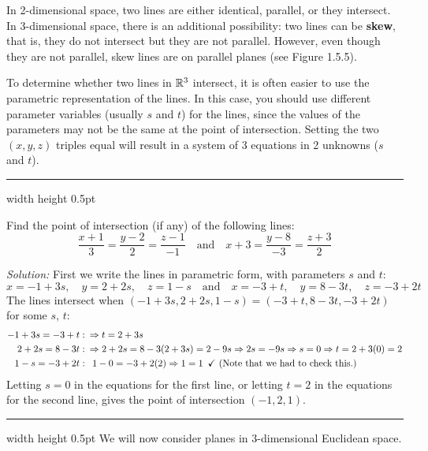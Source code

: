 \piccaption[]{}
In 2-dimensional space, two lines are either identical, parallel, or they intersect. In 3-dimensional space, there is an
additional possibility: two lines can be \textbf{skew}, that is, they do not intersect but they are not
parallel. However, even though they are not parallel, skew lines are on parallel planes (see Figure 1.5.5).

To determine
whether two lines in $\mathbb{R}^{3}$ intersect, it is often easier to use the parametric representation of the lines. In this
case, you should use different parameter variables (usually $s$ and $t$) for the lines, since the values of the
parameters may not be the same at the point of intersection. Setting the two $(x,y,z)$ triples equal will result in a
system of 3 equations in 2 unknowns ($s$ and $t$).

\vspace{2mm}
\hrule width \textwidth height 0.5pt
\begin{exmp}
 Find the point of intersection (if any) of the following lines:
 \begin{displaymath}
  \frac{x + 1}{3} = \frac{y - 2}{2} = \frac{z - 1}{-1} \quad \text{and} \quad
  x + 3 = \frac{y - 8}{-3} = \frac{z + 3}{2}
 \end{displaymath}
 \par\noindent\emph{Solution:} First we write the lines in parametric form, with parameters $s$ and $t$:
 \begin{displaymath}
  x = -1 + 3s,\quad y = 2 + 2s,\quad z = 1 - s \quad \text{and} \quad x = -3 + t,\quad y = 8 - 3t,\quad z = -3 + 2t
 \end{displaymath}
 The lines intersect when $(-1 + 3s,2 + 2s,1 - s) = (-3 + t,8 - 3t,-3 + 2t)$ for some $s$, $t$:
 \begin{align*}
  -1 + 3s = -3 + t &: \enskip\Rightarrow t = 2 + 3s\\
  2 + 2s = 8 - 3t &: \enskip\Rightarrow 2 + 2s = 8 - 3(2 + 3s) = 2 - 9s \Rightarrow 2s = -9s \Rightarrow s = 0
  \Rightarrow t = 2 + 3(0) = 2\\
  1 - s = -3 + 2t &: \enskip1 - 0 = -3 + 2(2) \Rightarrow 1 = 1 \enskip\checkmark \text{~(Note that we had to check
  this.)}
 \end{align*}
 Letting $s = 0$ in the equations for the first line, or letting $t = 2$ in the equations for the second line,
 gives the point of intersection $(-1,2,1)$.
\end{exmp}
\hrule width \textwidth height 0.5pt
\newpage
We will now consider planes in 3-dimensional Euclidean space.\vspace{1.5mm}

